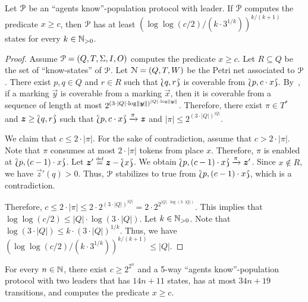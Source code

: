 \begin{theorem}
  Let $\mathcal{P}$ be an ``agents know''-population protocol with leader. If
  $\mathcal{P}$ computes the predicate $x \geq c$, then $\mathcal{P}$ has at least
  $(\log \log(c / 2) / (k \cdot 3^{1 / k}))^{k / (k + 1)}$ states for
  every $k \in \mathbb{N}_{>0}$. 
\end{theorem}

\begin{proof}
  Assume $\mathcal{P} = (Q, T, \Sigma, I, O)$ computes the predicate $x \geq
  c$. Let $R \subseteq Q$ be the set of ``know-states'' of $\mathcal{P}$. Let
  $\mathcal{N} = (Q, T, W)$ be the Petri net associated to $\mathcal{P}$. There exist
  $p, q \in Q$ and $r \in R$ such that $\Lbag q, r\Rbag$ is coverable
  from $\Lbag p, c \cdot x\Rbag$. By~\cite{Rac78}, if a marking
  $\vec{y}$ is coverable from a marking $\vec{x}$, then it is
  coverable from a sequence of length at most $2^{{(3 \cdot |Q| \cdot
      \log \lVert\bm{y}\rVert)}^{|Q| \cdot \log
      \lVert\bm{y}\rVert}}$. Therefore, there exist $\pi \in T^*$ and
  $\bm{z} \geq \Lbag q, r\Rbag$ such that $\Lbag p, c \cdot x\Rbag
  \xrightarrow{\pi} \bm{z}$ and $|\pi| \leq 2^{(3 \cdot |Q|)^{|Q|}}$.

  We claim that $c \leq 2 \cdot |\pi|$. For the sake of contradiction,
  assume that $c > 2 \cdot |\pi|$. Note that $\pi$ consumes at most $2
  \cdot |\pi|$ tokens from place $x$. Therefore, $\pi$ is enabled at
  $\Lbag p, (c - 1) \cdot x\Rbag$. Let $\bm{z}' \stackrel{\scriptscriptstyle\text{def}}{=} \bm{z} -
  \Lbag x\Rbag$. We obtain $\Lbag p, (c-1) \cdot x\Rbag \xrightarrow{\pi}
  \bm{z}'$. Since $x \not\in R$, we have $\vec{z}'(q) > 0$. Thus,
  $\mathcal{P}$ stabilizes to true from $\Lbag p, (c-1) \cdot x\Rbag$, which
  is a contradiction.

  Therefore, $c \leq 2 \cdot |\pi| \leq 2 \cdot 2^{(3 \cdot
    |Q|)^{|Q|}} = 2 \cdot 2^{2^{|Q| \cdot \log(3 \cdot |Q|)}}$. This
  implies that $\log \log (c / 2) \leq |Q| \cdot \log(3 \cdot
  |Q|)$. Let $k \in \mathbb{N}_{>0}$. Note that $\log(3 \cdot |Q|) \leq k
  \cdot (3 \cdot |Q|)^{1 / k}$. Thus, we have $(\log \log(c / 2) / (k
  \cdot 3^{1 / k}))^{k / (k + 1)} \leq |Q|$.
\end{proof}

\begin{theorem}\label{thm:loglog:upperbound}
  For every $n \in \mathbb{N}$, there exist $c \geq 2^{2^n}$ and a 5-way
  ``agents know''-population protocol with two leaders that has $14n +
  11$ states, has at most $34n + 19$ transitions, and computes the
  predicate $x \geq c$.
\end{theorem}

